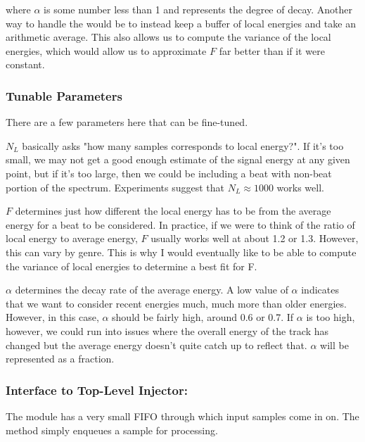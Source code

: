 \documentclass[letterpaper]{article}
\begin{document}
        where $\alpha$ is some number less than 1 and represents the degree of
        decay.  Another way to handle the  would be to instead
        keep a buffer of local energies and take an arithmetic average.  This also
        allows us to compute the variance of the local energies, which would allow
        us to approximate $F$ far better than if it were constant.

        
        \subsubsection{Tunable Parameters}

        There are a few parameters here that can be fine-tuned.

        $N_L$ basically asks "how many samples corresponds to local energy?".  If
        it's too small, we may not get a good enough estimate of the signal energy
        at any given point, but if it's too large, then we could be including a
        beat with non-beat portion of the spectrum.  Experiments suggest that $N_L
        \approx 1000$ works well.

        $F$ determines just how different the local energy has to be from the
        average energy for a beat to be considered.  In practice, if we were to
        think of the ratio of local energy to average energy, $F$ usually works
        well at about 1.2 or 1.3.  However, this can vary by genre.  This is why I
        would eventually like to be able to compute the variance of local energies
        to determine a best fit for F.

        $\alpha$ determines the decay rate of the average energy.  A low value of
        $\alpha$ indicates that we want to consider recent energies much, much more
        than older energies.  However, in this case, $\alpha$ should be fairly
        high, around 0.6 or 0.7.  If $\alpha$ is too high, however, we could run
        into issues where the overall energy of the track has changed but the
        average energy doesn't quite catch up to reflect that.  $\alpha$ will be
        represented as a  fraction.


        \subsubsection{Interface to Top-Level Injector: }

        The module has a very small FIFO through which input samples come in on.
        The method  simply enqueues a sample for processing.
            
\end{document}
